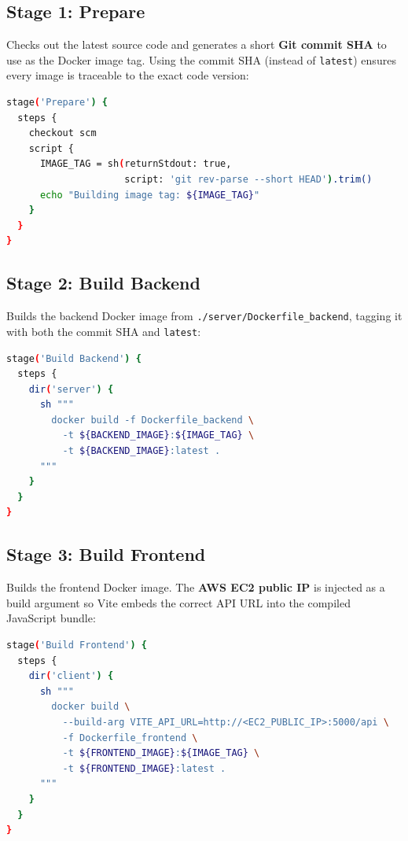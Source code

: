 \documentclass[12pt,a4paper]{report}
\begin{document}
\subsection{Stage 1: Prepare}

Checks out the latest source code and generates a short \textbf{Git commit SHA} to use as the Docker image tag. Using the commit SHA (instead of \texttt{latest}) ensures every image is traceable to the exact code version:

\begin{lstlisting}[language=bash, caption={Prepare stage}]
stage('Prepare') {
  steps {
    checkout scm
    script {
      IMAGE_TAG = sh(returnStdout: true,
                     script: 'git rev-parse --short HEAD').trim()
      echo "Building image tag: ${IMAGE_TAG}"
    }
  }
}
\end{lstlisting}

\subsection{Stage 2: Build Backend}

Builds the backend Docker image from \texttt{./server/Dockerfile\_backend}, tagging it with both the commit SHA and \texttt{latest}:

\begin{lstlisting}[language=bash, caption={Build Backend stage}]
stage('Build Backend') {
  steps {
    dir('server') {
      sh """
        docker build -f Dockerfile_backend \
          -t ${BACKEND_IMAGE}:${IMAGE_TAG} \
          -t ${BACKEND_IMAGE}:latest .
      """
    }
  }
}
\end{lstlisting}

\subsection{Stage 3: Build Frontend}

Builds the frontend Docker image. The \textbf{AWS EC2 public IP} is injected as a build argument so Vite embeds the correct API URL into the compiled JavaScript bundle:

\begin{lstlisting}[language=bash, caption={Build Frontend stage}]
stage('Build Frontend') {
  steps {
    dir('client') {
      sh """
        docker build \
          --build-arg VITE_API_URL=http://<EC2_PUBLIC_IP>:5000/api \
          -f Dockerfile_frontend \
          -t ${FRONTEND_IMAGE}:${IMAGE_TAG} \
          -t ${FRONTEND_IMAGE}:latest .
      """
    }
  }
}
\end{lstlisting}
\end{document}
